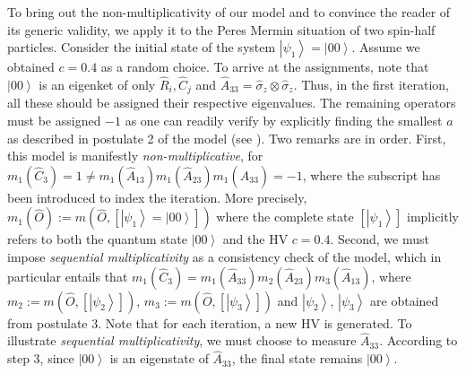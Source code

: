 \documentclass[british,aps,prl,superscriptaddress,nofootinbib,times,reprint]{revtex4-1}
\theoremstyle{plain}
\theoremstyle{definition}
\theoremstyle{remark}
\theoremstyle{remark}
\theoremstyle{remark}
\theoremstyle{plain}
\theoremstyle{plain}
\theoremstyle{plain}
\theoremstyle{definition}
\theoremstyle{definition}
\begin{document}
To bring out the non-multiplicativity of our model 
and to convince the reader of its generic validity,
we apply it to the Peres Mermin situation of two
spin-half particles. Consider the initial state of
the system 
$\left|\psi_{1}\right\rangle
=\left|00\right\rangle $. Assume we 
obtained $c=0.4$ as a random choice. To arrive
at the assignments, note that
$\left|00\right\rangle $ is an eigenket of only
$\hat{R}_{i},\hat{C}_{j}$ and
$\hat{A}_{33}=\hat{\sigma}_{z}\otimes\hat{\sigma}_{z}$.
Thus, in the first iteration, all these should be
assigned their respective eigenvalues. The
remaining operators must be assigned $-1$ as one
can readily verify by explicitly finding the
smallest $a$ as described in postulate 2 of the
model (see ). Two remarks are in
order. First, this model is manifestly
\emph{non-multiplicative}, for
$m_{1}(\hat{C}_{3})=1\neq
m_{1}(\hat{A}_{13})m_{1}(\hat{A}_{23})m_{1}(\hat{A}_{33})=-1$,
where the subscript has been introduced to index
the iteration. More precisely,
$m_{1}(\hat{O}):=m(\hat{O},\left[\left|\psi_{1}\right\rangle
=\left|00\right\rangle \right])$ where the
complete state $\left[\left|\psi_{1}\right\rangle
\right]$ implicitly refers to both the quantum
state $\left|00\right\rangle $ and the HV $c=0.4$.
Second, we must impose \emph{sequential
multiplicativity} as a consistency check of the
model, which in particular entails that
$m_{1}(\hat{C}_{3})=m_{1}(\hat{A}_{33})m_{2}(\hat{A}_{23})m_{3}(\hat{A}_{13})$,
where
$m_{2}:=m(\hat{O},\left[\left|\psi_{2}\right\rangle
\right])$,
$m_{3}:=m(\hat{O},\left[\left|\psi_{3}\right\rangle
\right])$ and $\left|\psi_{2}\right\rangle
,\,\left|\psi_{3}\right\rangle $ are obtained from
postulate 3. Note that for each iteration, a new
HV is generated. To illustrate \emph{sequential
multiplicativity}, we must choose to measure
$\hat{A}_{33}$. According to step 3, since
$\left|00\right\rangle $ is an eigenstate of
$\hat{A}_{33}$, the final state remains
$\left|00\right\rangle $.  
\end{document}
